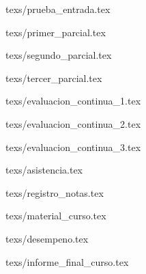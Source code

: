 \documentclass[11pt,fleqn]{book} %
\begin{document}
{texs/prueba_entrada.tex}

{texs/primer_parcial.tex}

{texs/segundo_parcial.tex}

{texs/tercer_parcial.tex}

{texs/evaluacion_continua_1.tex}

{texs/evaluacion_continua_2.tex}

{texs/evaluacion_continua_3.tex}

{texs/asistencia.tex}

{texs/registro_notas.tex}

{texs/material_curso.tex}

{texs/desempeno.tex}

{texs/informe_final_curso.tex}
\end{document}
